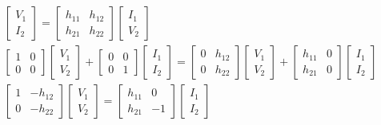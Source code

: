 \documentclass{article}
\numberwithin{equation}{subsection}
\begin{document}
\begin{gather*}
    \begin{bmatrix}
        V_1\\I_2
    \end{bmatrix}=\begin{bmatrix}
        h_{11}&h_{12}\\h_{21}&h_{22}
    \end{bmatrix}\begin{bmatrix}
        I_1\\V_2
    \end{bmatrix}\\
    \begin{bmatrix}
        1&0\\0&0
    \end{bmatrix}\begin{bmatrix}
        V_1\\V_2
    \end{bmatrix}+\begin{bmatrix}
        0&0\\0&1
    \end{bmatrix}\begin{bmatrix}
        I_1\\I_2
    \end{bmatrix}=\begin{bmatrix}
        0&h_{12}\\0&h_{22}
    \end{bmatrix}\begin{bmatrix}
        V_1\\V_2
    \end{bmatrix}+\begin{bmatrix}
        h_{11}&0\\h_{21}&0
    \end{bmatrix}\begin{bmatrix}
        I_1\\I_2
    \end{bmatrix}\\
    \begin{bmatrix}
        1&-h_{12}\\0&-h_{22}
    \end{bmatrix}\begin{bmatrix}
        V_1\\V_2
    \end{bmatrix}=\begin{bmatrix}
        h_{11}&0\\h_{21}&-1
    \end{bmatrix}\begin{bmatrix}
        I_1\\I_2
    \end{bmatrix}\\
\end{gather*}
\end{document}
